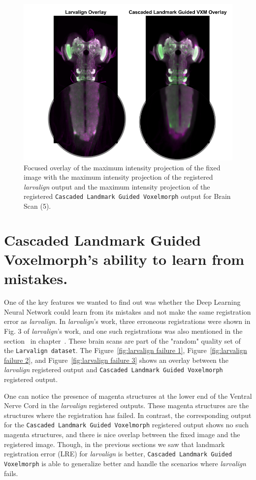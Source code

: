\documentclass{book}
\begin{document}
	\begin{figure}[h!]
		\centering
		\includegraphics[width=0.7\columnwidth]{resources/Chapter7/LRE_Visual/14c08c_overlay_zoomed.png}
		\caption{Focused overlay of the maximum intensity projection of the fixed image with the maximum intensity projection of the registered \textit{larvalign} output and the maximum intensity projection of the registered \texttt{Cascaded Landmark Guided Voxelmorph} output for Brain Scan (5).}
		\label{fig:14c08c_overlay}
	\end{figure}
	
	\newpage
	\section{Cascaded Landmark Guided Voxelmorph's ability to learn from mistakes.}
	One of the key features we wanted to find out was whether the Deep Learning Neural Network could learn from its mistakes and not make the same registration error as \textit{larvalign}. In \emph{larvalign}'s work, three erroneous registrations were shown in Fig. 3 of \textit{larvalign}'s work, and one such registrations was also mentioned in the section~ in chapter~. These brain scans are part of the "random" quality set of the \texttt{Larvalign dataset}. The Figure~\ref{fig:larvalign failure 1}, Figure~\ref{fig:larvalign failure 2}, and Figure~\ref{fig:larvalign failure 3} shows an overlay between the \textit{larvalign} registered output and \texttt{Cascaded Landmark Guided Voxelmorph} registered output.
	
	One can notice the presence of magenta structures at the lower end of the Ventral Nerve Cord in the \textit{larvalign} registered outputs. These magenta structures are the structures where the registration has failed. In contrast, the corresponding output for the \texttt{Cascaded Landmark Guided Voxelmorph} registered output shows no such magenta structures, and there is nice overlap between the fixed image and the registered image. Though, in the previous sections we saw that landmark registration error (LRE) for \textit{larvalign} is better, \texttt{Cascaded Landmark Guided Voxelmorph} is able to generalize better and handle the scenarios where \textit{larvalign} fails.
	
\end{document}
